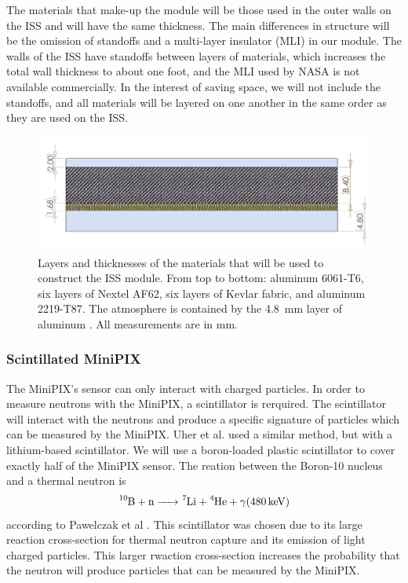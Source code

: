 {The materials that make-up the module will be those used in the outer walls on the ISS and will have the same thickness.
The main differences in structure will be the omission of standoffs and a multi-layer insulator (MLI) in our module.
The walls of the ISS have standoffs between layers of materials, which increases the total wall thickness to about one foot, and the MLI used by NASA is not available commercially.
In the interest of saving space, we will not include the standoffs, and all materials will be layered on one another in the same order as they are used on the ISS.

\begin{figure}[H]
  \centering
  \includegraphics[width=0.8\linewidth]{Figures/MaterialCrossSection.png}
  \caption{Layers and thicknesses of the materials that will be used to construct the ISS module. From top to bottom: aluminum 6061-T6, six layers of Nextel AF62, six layers of Kevlar fabric, and aluminum 2219-T87. The atmosphere is contained by the \SI{4.8}{\milli\meter} layer of aluminum \cite{NASAPP}. All measurements are in \si{\milli\meter}.} 
  \label{fig:ISSLayers}
\end{figure}


\subsubsection{Scintillated MiniPIX}
The MiniPIX's sensor can only interact with charged particles. In order to measure neutrons with the MiniPIX, a scintillator is rerquired. The scintillator will interact with the neutrons and produce a specific signature of particles which can be measured by the MiniPIX. Uher et al. \cite{Uher} used a similar method, but with a lithium-based scintillator. We will use a boron-loaded plastic scintillator \cite{BoronScintillator} to cover exactly half of the MiniPIX sensor. The reation between the Boron-10 nucleus and a thermal neutron is \[\ce{^10B + n -> ^7Li + ^4He + \gamma (\SI{480}{\kilo\eV})}\] according to Pawelczak et al \cite{Pawelczak}. This scintillator was chosen due to its large reaction cross-section for thermal neutron capture and its emission of light charged particles. This larger rwaction cross-section increases the probability that the neutron will produce particles that can be measured by the MiniPIX.

}

